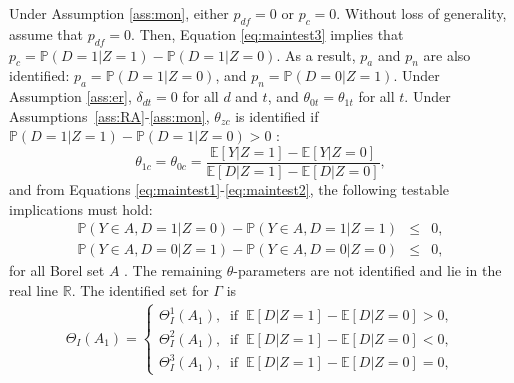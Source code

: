 \documentclass[12pt]{article}
\theoremstyle{plain}
\theoremstyle{definition}
\theoremstyle{remark}
\begin{document}
Under Assumption \ref{ass:mon}, either $p_{df}=0$ or $p_c=0$. Without loss of generality, assume that $p_{df}=0$. Then, Equation \eqref{eq:maintest3} implies that $p_c=\mathbb{P}(D=1  \vert  Z=1)-\mathbb{P}(D=1  \vert  Z=0)$. As a result, $p_a$ and $p_n$ are also identified: $p_a=\mathbb P(D=1\vert Z=0)$, and $p_n=\mathbb P(D=0\vert Z=1)$. Under Assumption \ref{ass:er}, $\delta_{dt}=0$ for all $d$ and $t$, and $\theta_{0t}=\theta_{1t}$ for all $t$. Under Assumptions~\ref{ass:RA}-\ref{ass:mon}, $\theta_{zc}$ is identified if $\mathbb{P}(D=1  \vert  Z=1)-\mathbb{P}(D=1  \vert  Z=0)>0$ \citep{imbens1994identification}: $$\theta_{1c}=\theta_{0c}=\frac{\mathbb E[Y\vert Z=1]-\mathbb E[Y\vert Z=0]}{\mathbb E[D\vert Z=1]-\mathbb E[D\vert Z=0]},$$
and from Equations \eqref{eq:maintest1}-\eqref{eq:maintest2}, the following testable implications must hold:
\begin{eqnarray}
\mathbb{P}(Y \in A, D=1  \vert  Z=0)-\mathbb{P}(Y \in A, D=1  \vert  Z=1) &\leq& 0, \label{eq:testimpl1}\\
\mathbb{P}(Y \in A, D=0  \vert  Z=1)-\mathbb{P}(Y \in A, D=0  \vert  Z=0) &\leq & 0,\label{eq:testimpl2}
\end{eqnarray}
for all Borel set $A$ \citep{Balke1997BoundsCompliance, Heckman2005StructuralEvaluation, Kitagawa2015AValidity, Mourifie2017TestingAssumptions}. The remaining $\theta$-parameters are not identified and lie in the real line $\mathbb R$. %
The identified set for $\Gamma$ is 
\begin{eqnarray*} 
\Theta_I(A_1)=\left\{\begin{array}{l}
        \Theta_I^1(A_1),\ \text{ if }\ \mathbb{E}[D  \vert  Z=1] - \mathbb{E}[D  \vert  Z=0]> 0,\\
        \Theta_I^2(A_1),\ \text{ if }\ \mathbb{E}[D  \vert  Z=1] - \mathbb{E}[D  \vert  Z=0]< 0,\\
       \Theta_I^3(A_1),\ \text{ if }\ \mathbb{E}[D  \vert  Z=1] - \mathbb{E}[D  \vert  Z=0]= 0,
        \end{array}\right.
\end{eqnarray*}
\end{document}
